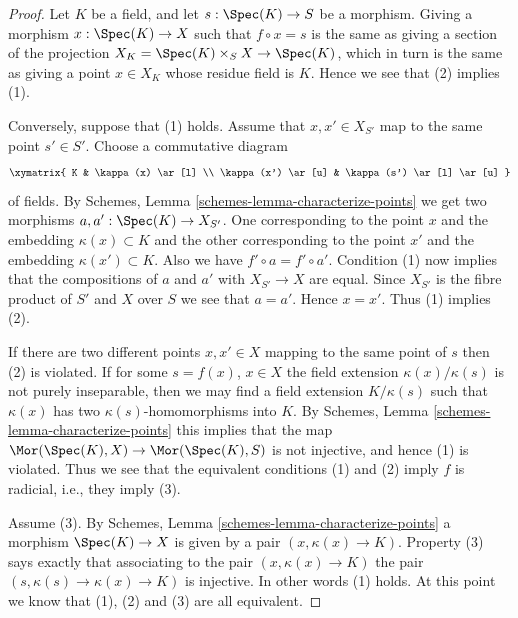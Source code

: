 \begin{proof}
Let $K$ be a field, and let $s : \Spec(K) \to S$ be a morphism.
Giving a morphism $x : \Spec(K) \to X$ such that $f \circ x = s$
is the same as giving a section of the projection
$X_K = \Spec(K) \times_S X \to \Spec(K)$, which in turn
is the same as giving a point $x \in X_K$ whose residue field is $K$.
Hence we see that (2) implies (1).

\medskip\noindent
Conversely, suppose that (1) holds. Assume that $x, x' \in X_{S'}$
map to the same point $s' \in S'$. Choose a commutative diagram
$$
\xymatrix{
K & \kappa(x) \ar[l] \\
\kappa(x') \ar[u] & \kappa(s') \ar[l] \ar[u]
}
$$
of fields. By Schemes, Lemma \ref{schemes-lemma-characterize-points}
we get two morphisms $a, a' : \Spec(K) \to X_{S'}$. One corresponding
to the point $x$ and the embedding $\kappa(x) \subset K$ and
the other corresponding to the  point $x'$ and the embedding
$\kappa(x') \subset K$. Also we have $f' \circ a = f' \circ a'$.
Condition (1) now implies that the compositions of $a$ and $a'$ with
$X_{S'} \to X$ are equal. Since $X_{S'}$ is the fibre product
of $S'$ and $X$ over $S$ we see that $a = a'$. Hence $x = x'$.
Thus (1) implies (2).

\medskip\noindent
If there are two different points $x, x' \in X$ mapping to the same point of $s$
then (2) is violated.
If for some $s = f(x)$, $x \in X$ the field extension
$\kappa(x)/\kappa(s)$ is not purely inseparable, then
we may find a field extension $K/\kappa(s)$ such that
$\kappa(x)$ has two $\kappa(s)$-homomorphisms into $K$. By
Schemes, Lemma \ref{schemes-lemma-characterize-points} this
implies that the map
$\Mor(\Spec(K), X) \to \Mor(\Spec(K), S)$
is not injective, and hence (1) is violated.
Thus we see that the equivalent conditions (1) and (2) imply
$f$ is radicial, i.e., they imply (3).

\medskip\noindent
Assume (3). By
Schemes, Lemma \ref{schemes-lemma-characterize-points}
a morphism $\Spec(K) \to X$ is given by a pair $(x, \kappa(x) \to K)$.
Property (3) says exactly that associating to the pair
$(x, \kappa(x) \to K)$ the pair $(s, \kappa(s) \to \kappa(x) \to K)$
is injective. In other words (1) holds. At this point we know that
(1), (2) and (3) are all equivalent.


\end{proof}
